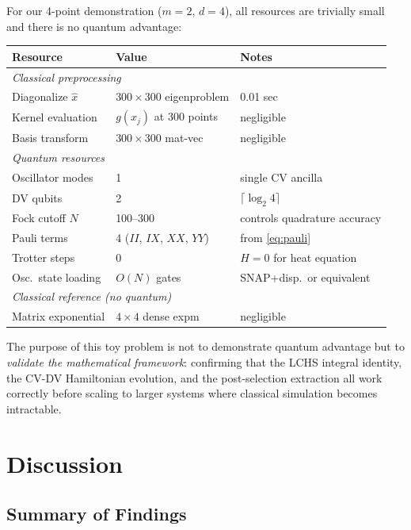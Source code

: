 \documentclass[11pt]{article}
\begin{document}
For our 4-point demonstration ($m=2$, $d=4$), all resources are trivially
small and there is no quantum advantage:
\begin{center}
\begin{tabular}{lll}
  \toprule
  Resource & Value & Notes \\
  \midrule
  \multicolumn{3}{l}{\textit{Classical preprocessing}} \\
  Diagonalize $\hat{x}$ & $300 \times 300$ eigenproblem & 0.01 sec \\
  Kernel evaluation & $g(x_j)$ at 300 points & negligible \\
  Basis transform & $300\times 300$ mat-vec & negligible \\
  \midrule
  \multicolumn{3}{l}{\textit{Quantum resources}} \\
  Oscillator modes & 1 & single CV ancilla \\
  DV qubits & 2 & $\lceil\log_2 4\rceil$ \\
  Fock cutoff $N$ & 100--300 & controls quadrature accuracy \\
  Pauli terms & 4 ($II$, $IX$, $XX$, $YY$) & from \cref{eq:pauli} \\
  Trotter steps & 0 & $H=0$ for heat equation \\
  Osc.\ state loading & $O(N)$ gates & SNAP+disp.\ or equivalent \\
  \midrule
  \multicolumn{3}{l}{\textit{Classical reference (no quantum)}} \\
  Matrix exponential & $4\times 4$ dense expm & negligible \\
  \bottomrule
\end{tabular}
\end{center}

The purpose of this toy problem is not to demonstrate quantum advantage
but to \emph{validate the mathematical framework}: confirming that the
LCHS integral identity, the CV-DV Hamiltonian evolution, and the
post-selection extraction all work correctly before scaling to larger
systems where classical simulation becomes intractable.

\section{Discussion}

\subsection{Summary of Findings}
\end{document}
